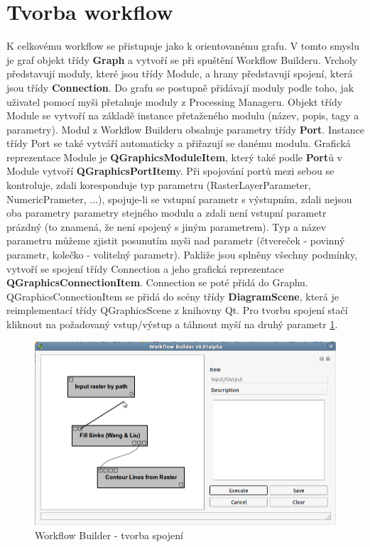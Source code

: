 \newpage
\section{Tvorba workflow}
K celkovému workflow se přistupuje jako k orientovanému grafu. V tomto smyslu je graf objekt třídy \textbf{Graph} a vytvoří se při spuštění Workflow Builderu. Vrcholy představují moduly, které jsou třídy Module, a hrany představují spojení, která jsou třídy \textbf{Connection}. Do grafu se postupně přidávají moduly podle toho, jak uživatel pomocí myši přetahuje moduly z Processing Manageru. Objekt třídy Module se vytvoří na základě instance přetaženého modulu (název, popis, tagy a parametry). Modul z Workflow Builderu obsahuje parametry třídy \textbf{Port}. Instance třídy Port se také vytváří automaticky a přiřazují se danému modulu. Grafická reprezentace Module je \textbf{QGraphicsModuleItem}, který také podle \textbf{Port}ů v Module vytvoří \textbf{QGraphicsPortItem}y. Při spojování portů mezi sebou se kontroluje, zdali koresponduje typ parametru (RasterLayerParameter, NumericPrameter, ...), spojuje-li se vstupní parametr s výstupním, zdali nejsou oba parametry parametry stejného modulu a zdali není vstupní parametr prázdný (to znamená, že není spojený s jiným parametrem). Typ a název parametru můžeme zjistit posunutím myši nad parametr (čtvereček - povinný parametr, kolečko - volitelný parametr). Pakliže jsou splněny všechny podmínky, vytvoří se spojení třídy Connection a jeho grafická reprezentace \textbf{QGraphicsConnectionItem}. Connection se poté přidá do Graphu. QGraphicsConnectionItem se přidá do scény třídy \textbf{DiagramScene}, která je reimplementací třídy QGraphicsScene z knihovny Qt. Pro tvorbu spojení stačí kliknout na požadovaný vstup/výstup a táhnout myší na druhý parametr \figurename \ref{wf:crCon}.

\begin{figure}[h]
	\centering
	\includegraphics[scale=0.5]{pictures/wf/wf_crCon}
	\caption{Workflow Builder - tvorba spojení}
  	\label{wf:crCon}
\end{figure}

